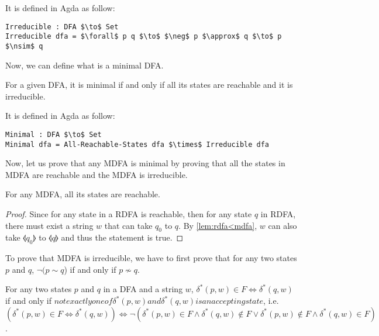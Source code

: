 \par It is defined in Agda as follow:
\begin{lstlisting}[mathescape=true,xleftmargin=.3\textwidth]
Irreducible : DFA $\to$ Set
Irreducible dfa = $\forall$ p q $\to$ $\neg$ p $\approx$ q $\to$ p $\nsim$ q
\end{lstlisting}

\par Now, we can define what is a minimal DFA. 

\begin{defn}
\noindent For a given DFA, it is minimal if and only if all its states
are reachable and it is irreducible. 
\end{defn}

\par It is defined in Agda as follow:
\begin{lstlisting}[mathescape=true,xleftmargin=.3\textwidth]
Minimal : DFA $\to$ Set
Minimal dfa = All-Reachable-States dfa $\times$ Irreducible dfa
\end{lstlisting}

\par Now, let us prove that any MDFA is minimal by proving that all the states in MDFA are reachable and the MDFA
is irreducible. 

\begin{thm}
\label{thm:all_reach}
\noindent For any MDFA, all its states are reachable. 
\end{thm}

\begin{proof}
\noindent Since for any state in a RDFA is reachable, then for any
state \(q\) in RDFA, there must
exist a string \(w\) that can take \(q_0\) to \(q\). By
\autoref{lem:rdfa<mdfa}, \(w\) can also take \(\llangle q_0
\rrangle\) to \(\llangle q \rrangle\) and thus the statement is true. 
\end{proof}

\par To prove that MDFA is irreducible, we have to first prove
that for any two states \(p\) and \(q\), \(\neg (p \sim q\)) if and only if
\(p \nsim q\). 

\begin{lem}
\label{lem:sim_nsim1}
\noindent For any two states \(p\) and \(q\) in a DFA and a string
\(w\), \(\delta^*(p,w) \in F \Leftrightarrow \delta^*(q,w)\) if and
only if \(not exactly one of \delta^*(p,w) and \delta^*(q,w) is
an accepting state\), i.e. \((\delta^*(p,w) \in F \Leftrightarrow
\delta^*(q,w)) \Leftrightarrow \neg (\delta^*(p,w) \in F \wedge \delta^*(q,w) \notin F \vee
\delta^*(p,w) \notin F \wedge \delta^*(q,w) \in F)\). 
\end{lem}

